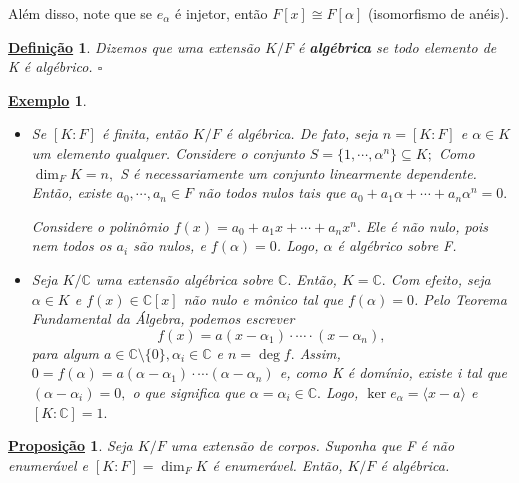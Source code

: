 \documentclass{article}
\newtheorem*{def*}{\underline{Defini\c c\~ao}}
\newtheorem*{prop*}{\underline{Proposi\c c\~ao}}
\newtheorem{example}{\underline{Exemplo}}
\begin{document}
Além disso, note que se \(e_{\alpha }\) é injetor, então \(F[x]\cong{F[\alpha ]}\) (isomorfismo de anéis).
\begin{def*}
  Dizemos que uma extensão \(K/F\) é \textbf{algébrica} se todo elemento de K é algébrico. \(\square\)
\end{def*}
\begin{example}
  \begin{itemize}
    \item[1)] Se \([K:F]\) é finita, então \(K/F\) é algébrica. De fato, seja \(n=[K:F]\) e \(\alpha \in K\) um elemento qualquer.
      Considere o conjunto \(S = \{1, \cdots, \alpha ^{n}\}\subseteq{K};\) Como \(\dim_{F}K = n,\) S é necessariamente um conjunto linearmente
      dependente. Então, existe \(a_{0}, \cdots, a_{n}\in F\) não todos nulos tais que \(a_{0} + a_{1}\alpha + \cdots + a_{n}\alpha^{n} = 0.\)

      Considere o polinômio \(f(x) = a_{0}+a_{1}x + \cdots + a_{n}x^{n}.\) Ele é não nulo, pois nem todos os \(a_{i}\) são nulos,
      e \(f(\alpha ) = 0\). Logo, \(\alpha \) é algébrico sobre F.

    \item[2)] Seja \(K/\mathbb{C}\) uma extensão algébrica sobre \(\mathbb{C}.\) Então, \(K = \mathbb{C}.\) Com efeito, seja \(\alpha \in K\)
      e \(f(x)\in \mathbb{C}[x]\) não nulo e mônico tal que \(f(\alpha ) = 0\). Pelo Teorema Fundamental da Álgebra, podemos escrever 
      \[
        f(x) = a(x-\alpha_{1})\cdot \cdots \cdot (x-\alpha_{n}),
      \]
      para algum \(a\in \mathbb{C}\setminus{\{0\}},\alpha_{i}\in \mathbb{C}\) e \(n = \deg{f}.\) Assim, \(0 = f(\alpha ) = a(\alpha -\alpha_{1})\cdot \cdots(\alpha -\alpha_{n})\)
      e, como K é domínio, existe i tal que \((\alpha -\alpha_{i})=0,\) o que significa que \(\alpha=\alpha_{i}\in \mathbb{C}.\) Logo, \(\ker{e_{\alpha }}=\langle x-a \rangle\) e \([K:\mathbb{C}] = 1.\)
  \end{itemize}
\end{example}
\begin{prop*}
  Seja \(K/F\) uma extensão de corpos. Suponha que F é não enumerável e \([K:F]=\dim_{F}K\) é enumerável. Então,
  \(K/F\) é algébrica.
\end{prop*}
\end{document}

